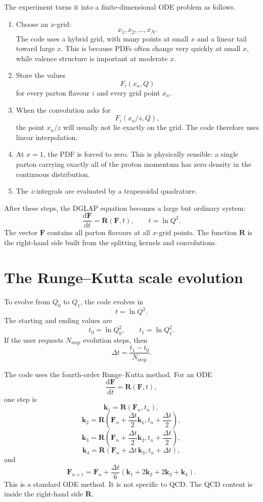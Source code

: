 \documentclass[11pt]{article}
\newcommand{\dd}{\mathrm{d}}
\begin{document}
The experiment turns it into a finite-dimensional ODE problem as follows.

\begin{enumerate}
  \item Choose an \(x\)-grid:
        \[
          x_1,x_2,\ldots,x_N.
        \]
        The code uses a hybrid grid, with many points at small \(x\) and a
        linear tail toward large \(x\).  This is because PDFs often change very
        quickly at small \(x\), while valence structure is important at
        moderate \(x\).
  \item Store the values
        \[
          F_i(x_a,Q)
        \]
        for every parton flavour \(i\) and every grid point \(x_a\).
  \item When the convolution asks for
        \[
          F_i(x_a/z,Q),
        \]
        the point \(x_a/z\) will usually not lie exactly on the grid.  The code
        therefore uses linear interpolation.
  \item At \(x=1\), the PDF is forced to zero.  This is physically sensible:
        a single parton carrying exactly all of the proton momentum has zero
        density in the continuous distribution.
  \item The \(z\)-integrals are evaluated by a trapezoidal quadrature.
\end{enumerate}

After these steps, the DGLAP equation becomes a large but ordinary system:
\[
  \frac{\dd \mathbf{F}}{\dd t}
  =
  \mathbf{R}(\mathbf{F},t),
  \qquad
  t=\ln Q^2.
\]
The vector \(\mathbf{F}\) contains all parton flavours at all \(x\)-grid points.
The function \(\mathbf{R}\) is the right-hand side built from the splitting
kernels and convolutions.

\section{The Runge--Kutta scale evolution}

To evolve from \(Q_0\) to \(Q_1\), the code evolves in
\[
  t=\ln Q^2.
\]
The starting and ending values are
\[
  t_0 = \ln Q_0^2,
  \qquad
  t_1 = \ln Q_1^2.
\]
If the user requests \(N_{\mathrm{step}}\) evolution steps, then
\[
  \Delta t = \frac{t_1-t_0}{N_{\mathrm{step}}}.
\]

The code uses the fourth-order Runge--Kutta method.  For an ODE
\[
  \frac{\dd \mathbf{F}}{\dd t} = \mathbf{R}(\mathbf{F},t),
\]
one step is
\[
  \mathbf{k}_1 = \mathbf{R}(\mathbf{F}_n,t_n),
\]
\[
  \mathbf{k}_2 =
  \mathbf{R}\left(
  \mathbf{F}_n+\frac{\Delta t}{2}\mathbf{k}_1,
  t_n+\frac{\Delta t}{2}
  \right),
\]
\[
  \mathbf{k}_3 =
  \mathbf{R}\left(
  \mathbf{F}_n+\frac{\Delta t}{2}\mathbf{k}_2,
  t_n+\frac{\Delta t}{2}
  \right),
\]
\[
  \mathbf{k}_4 =
  \mathbf{R}\left(
  \mathbf{F}_n+\Delta t\,\mathbf{k}_3,
  t_n+\Delta t
  \right),
\]
and
\[
  \mathbf{F}_{n+1}
  =
  \mathbf{F}_n
  +
  \frac{\Delta t}{6}
  \left(
  \mathbf{k}_1
  +2\mathbf{k}_2
  +2\mathbf{k}_3
  +\mathbf{k}_4
  \right).
\]
This is a standard ODE method.  It is not specific to QCD.  The QCD content is
inside the right-hand side \(\mathbf{R}\).
\end{document}
